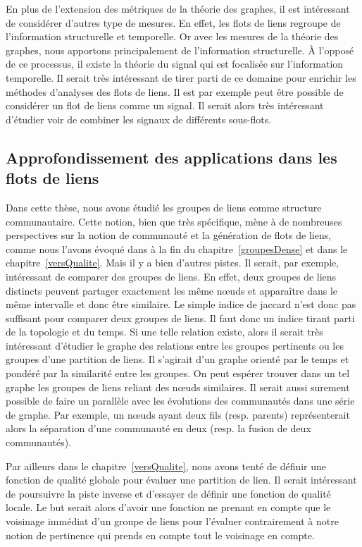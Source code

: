 En plus de l'extension des métriques de la théorie  des graphes, il est intéressant de considérer d'autres type de mesures.
En effet, les flots de liens regroupe de l'information structurelle et temporelle.
Or avec les mesures de la théorie des graphes, nous apportons principalement de l'information structurelle.
\`A l'opposé de ce processus, il existe la théorie du signal qui est focalisée sur l'information temporelle.
Il serait très intéressant de tirer parti de ce domaine pour enrichir les méthodes d'analyses des flots de liens.
Il est par exemple peut être possible de considérer un flot de liens comme un signal.
Il serait alors très intéressant d'étudier voir de combiner les signaux de différents sous-flots.

\subsection{Approfondissement des applications dans les flots de liens}
Dans cette thèse, nous avons étudié les groupes de liens comme structure communautaire.
Cette notion, bien que très spécifique, mène à de nombreuses perspectives sur la notion de communauté et la génération de flots de liens, comme nous l'avons évoqué dans à la fin du chapitre~\ref{groupesDense} et dans le chapitre~\ref{versQualite}.
Mais il y a bien d'autres pistes.
Il serait, par exemple, intéressant de comparer des groupes de liens.
En effet, deux groupes de liens distincts peuvent partager exactement les même n\oe uds et apparaître dans le même intervalle et donc être similaire.
Le simple indice de jaccard n'est donc pas suffisant pour comparer deux groupes de liens.
Il faut donc un indice tirant parti de la topologie et du temps.
Si une telle relation existe, alors il serait très intéressant d'étudier le graphe des relations entre les groupes pertinents ou les groupes d'une partition de liens.
Il s'agirait d'un graphe orienté par le temps et pondéré par la similarité entre les groupes.
On peut espérer trouver dans un tel graphe les groupes de liens reliant des n\oe uds similaires.
Il serait aussi surement possible de faire un parallèle avec les évolutions des communautés dans une série de graphe.
Par exemple, un n\oe uds ayant deux fils (resp. parents) représenterait alors la séparation d'une communauté en deux (resp. la fusion de deux communautés).

Par ailleurs dans le chapitre~\ref{versQualite}, nous avons tenté de définir une fonction de qualité globale pour évaluer une partition de lien.
Il serait intéressant de poursuivre la piste inverse et d'essayer de définir une fonction de qualité locale.
Le but serait alors d'avoir une fonction ne prenant en compte que le voisinage immédiat d'un groupe de liens pour l'évaluer contrairement à notre notion de pertinence qui prends en compte tout le voisinage en compte.

